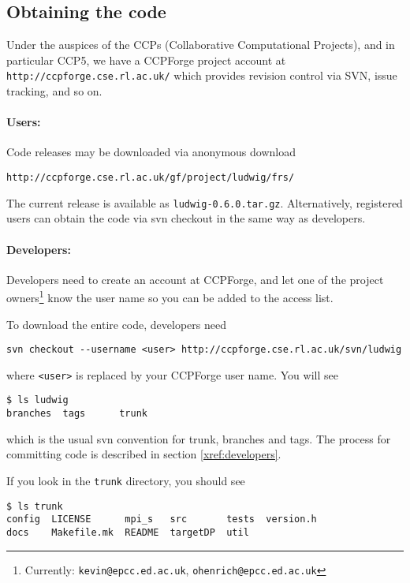 \subsection{Obtaining the code}

Under the auspices of the CCPs (Collaborative Computational Projects),
and in particular CCP5, we have a CCPForge project account at
\texttt{http://ccpforge.cse.rl.ac.uk/}
which provides revision control via SVN, issue tracking, and so on.

\paragraph{Users:}

Code releases may be downloaded via anonymous download
\begin{lstlisting}[style=terminalverbatim]
http://ccpforge.cse.rl.ac.uk/gf/project/ludwig/frs/
\end{lstlisting}
The current release is available as \texttt{ludwig-0.6.0.tar.gz}.
Alternatively, registered users can obtain the code via svn checkout
in the same way as developers.


\paragraph{Developers:}

Developers need to create an account at CCPForge, and let one of the
project owners\footnote{Currently: \texttt{kevin@epcc.ed.ac.uk},
\texttt{ohenrich@epcc.ed.ac.uk}}
know the user name so you can be added to the access list.

To download the entire code, developers need
\begin{lstlisting}
svn checkout --username <user> http://ccpforge.cse.rl.ac.uk/svn/ludwig
\end{lstlisting}
where \texttt{<user>} is replaced by your CCPForge user name. You will
see
\begin{lstlisting}
$ ls ludwig
branches  tags      trunk
\end{lstlisting}
which is the usual svn convention for trunk, branches and tags.
The process for committing code is described in section \ref{xref:developers}.

If you look in  the \texttt{trunk} directory, you should see
\begin{lstlisting}
$ ls trunk
config  LICENSE      mpi_s   src       tests  version.h
docs    Makefile.mk  README  targetDP  util
\end{lstlisting}

